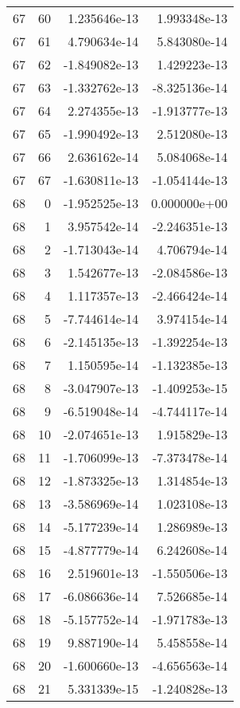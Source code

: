 \begin{tabular}{rrrr}
  67 &   60 &  1.235646e-13 &  1.993348e-13 \\
  67 &   61 &  4.790634e-14 &  5.843080e-14 \\
  67 &   62 & -1.849082e-13 &  1.429223e-13 \\
  67 &   63 & -1.332762e-13 & -8.325136e-14 \\
  67 &   64 &  2.274355e-13 & -1.913777e-13 \\
  67 &   65 & -1.990492e-13 &  2.512080e-13 \\
  67 &   66 &  2.636162e-14 &  5.084068e-14 \\
  67 &   67 & -1.630811e-13 & -1.054144e-13 \\
  68 &    0 & -1.952525e-13 &  0.000000e+00 \\
  68 &    1 &  3.957542e-14 & -2.246351e-13 \\
  68 &    2 & -1.713043e-14 &  4.706794e-14 \\
  68 &    3 &  1.542677e-13 & -2.084586e-13 \\
  68 &    4 &  1.117357e-13 & -2.466424e-14 \\
  68 &    5 & -7.744614e-14 &  3.974154e-14 \\
  68 &    6 & -2.145135e-13 & -1.392254e-13 \\
  68 &    7 &  1.150595e-14 & -1.132385e-13 \\
  68 &    8 & -3.047907e-13 & -1.409253e-15 \\
  68 &    9 & -6.519048e-14 & -4.744117e-14 \\
  68 &   10 & -2.074651e-13 &  1.915829e-13 \\
  68 &   11 & -1.706099e-13 & -7.373478e-14 \\
  68 &   12 & -1.873325e-13 &  1.314854e-13 \\
  68 &   13 & -3.586969e-14 &  1.023108e-13 \\
  68 &   14 & -5.177239e-14 &  1.286989e-13 \\
  68 &   15 & -4.877779e-14 &  6.242608e-14 \\
  68 &   16 &  2.519601e-13 & -1.550506e-13 \\
  68 &   17 & -6.086636e-14 &  7.526685e-14 \\
  68 &   18 & -5.157752e-14 & -1.971783e-13 \\
  68 &   19 &  9.887190e-14 &  5.458558e-14 \\
  68 &   20 & -1.600660e-13 & -4.656563e-14 \\
  68 &   21 &  5.331339e-15 & -1.240828e-13 \\

\end{tabular}

